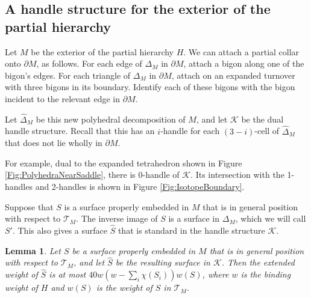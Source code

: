 \documentclass[oneside]{amsart}
\numberwithin{equation}{section}
\theoremstyle{plain}
\newtheorem{lemma}[equation]{Lemma}
\theoremstyle{definition}
\newcommand{\calT}{{\mathcal{T}}}
\begin{document}
\subsection{A handle structure for the exterior of the partial hierarchy}
\label{Subsec:HierarchyExteriorHS}

Let $M$ be the exterior of the partial hierarchy $H$.
We can attach a partial collar onto $\partial M$, as follows. For each edge of $\Delta_M$ in $\partial M$,
attach a bigon along one of the bigon's edges. For each triangle of $\Delta_M$ in $\partial M$,
attach on an expanded turnover with three bigons in its boundary. Identify each of 
these bigons with the bigon incident to the relevant edge in $\partial M$.

Let $\hat \Delta_M$ be this new polyhedral decomposition of $M$, and let $\mathcal{K}$
be the dual handle structure. Recall that this has an $i$-handle for each $(3-i)$-cell of $\hat \Delta_M$ that
does not lie wholly in $\partial M$.

For example, dual to the expanded tetrahedron shown in Figure \ref{Fig:PolyhedraNearSaddle}, there is 
0-handle of $\mathcal{K}$. Its intersection with the 1-handles and 2-handles is shown in Figure \ref{Fig:IsotopeBoundary}.

Suppose that $S$ is a surface properly embedded in $M$ that is in general position with respect
to $\mathcal{T}_M$. The inverse image of $S$ is a surface in $\Delta_M$, which we will call $S'$.
This also gives a surface $\hat S$ that is standard in the handle structure $\mathcal{K}$.

\begin{lemma}
\label{Lem:ExtendedWeightEstimate}
Let $S$ be a surface properly embedded in $M$ that is in general position with respect to $\calT_M$, 
and let $\hat S$ be the resulting surface in $\mathcal{K}$.
Then the extended weight of $\hat S$ is at most $40w(w - \sum_i \chi(S_i))w(S)$, where $w$ is
the binding weight of $H$ and $w(S)$ is the weight of $S$ in $\calT_M$.
\end{lemma}
\end{document}
